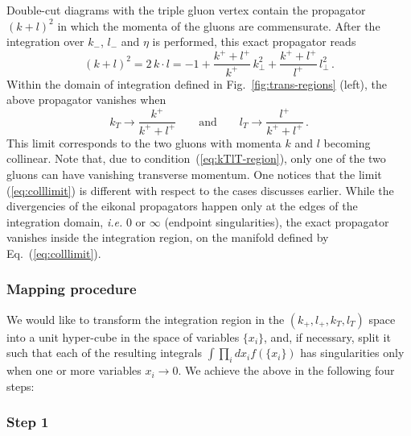 \documentclass[a4paper,11pt]{article}
\newcommand{\ie}{{\it i.e. }}
\newcommand{\kp}{k_+}
\newcommand{\lp}{l_+}
\numberwithin{equation}{section}
\begin{document}
Double-cut diagrams with the triple gluon vertex contain the propagator $(k + l)^2$
in which the momenta of the gluons are commensurate.  After the integration over
$k_-$, $l_-$ and $\eta$ is performed, this exact propagator
reads
%
%
\begin{equation}
  (k+l)^2  = 2\,k\cdot l  =   
  -1 + 
  \frac{k^+ + l^+}{k^+}\, k_\perp^2  + 
  \frac{k^+ + l^+}{l^+}\, l_\perp^2\,.
\end{equation}
%
Within the domain of integration defined in
Fig.~\ref{fig:trans-regions} (left), the above propagator vanishes when
%
\begin{equation}
  k_T \to \frac{k^+}{k^+ + l^+} 
  \qquad \text{and} \qquad
  l_T \to \frac{l^+}{k^+ + l^+}\,.
  \label{eq:colllimit}
\end{equation}
%
This limit corresponds to the two gluons with momenta $k$ and $l$ becoming
collinear. 
%
Note that, due to condition~(\ref{eq:kTlT-region}), only one of the two gluons
can have vanishing transverse momentum.
%
One notices that the limit (\ref{eq:colllimit}) is different with respect to the
cases discusses earlier. While the divergencies of the eikonal propagators
happen only at the edges of the integration domain, \ie $0$ or $\infty$
(endpoint singularities), the exact propagator vanishes inside the integration
region, on the manifold defined by Eq.~(\ref{eq:colllimit}).


\subsubsection{Mapping procedure}
\label{sec:mapping}

We would like to transform the integration region in the $(\kp, \lp, k_T, l_T)$
space into a unit hyper-cube in the space of variables $\{x_i\}$, and, if
necessary, split it such that each of the resulting integrals $\int \prod_i d
x_i f(\{x_i\})$ has singularities only when one or more variables $x_i \to 0$.
%
We achieve the above in the following four steps:
 

\subsubsection*{Step 1}
\end{document}
